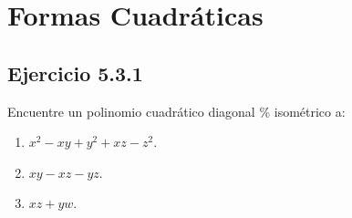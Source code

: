 

\chapter{Formas Cuadráticas}%
	\section*{Ejercicio 5.3.1}
	Encuentre un polinomio cuadrático diagonal \% isométrico a:
	\begin{enumerate}
		\item $x^2-xy+y^2+xz-z^2$.
		\item $xy-xz-yz$.
		\item $xz+yw$.
	\end{enumerate}
